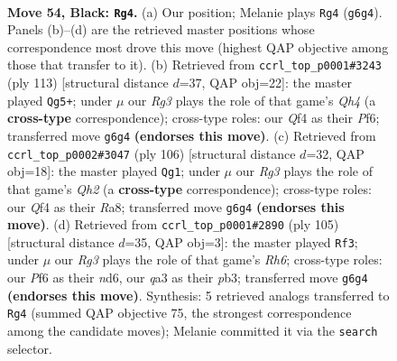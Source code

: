 \documentclass[11pt]{article}
\begin{document}
\clearpage

\begin{figure}[p]\centering
\begin{subfigure}{0.46\textwidth}\centering
\resizebox{\linewidth}{!}{%
\newchessgame
\chessboard[
  setfen={8/8/5pr1/3p1k2/5q2/Q5P1/P6P/6K1 b - - 3 54},
  showmover=false,
  pgfstyle=straightmove, color=movearrow, markmove={g6-g4}
]}
\caption{}
\end{subfigure}\hfill
\begin{subfigure}{0.46\textwidth}\centering
\resizebox{\linewidth}{!}{%
\newchessgame
\chessboard[
  setfen={8/7p/5p1k/p1Q2P1q/P7/6K1/5P2/8 b - - 4 57},
  showmover=false,
  pgfstyle=straightmove, color=movearrow, markmove={h5-g5}
]}
\caption{}
\end{subfigure}
\\[4pt]
\begin{subfigure}{0.46\textwidth}\centering
\resizebox{\linewidth}{!}{%
\newchessgame
\chessboard[
  setfen={R7/6pk/7p/8/1p6/8/1P4PQ/4q2K w - - 7 54},
  showmover=false,
  pgfstyle=straightmove, color=movearrow, markmove={h2-g1}
]}
\caption{}
\end{subfigure}\hfill
\begin{subfigure}{0.46\textwidth}\centering
\resizebox{\linewidth}{!}{%
\newchessgame
\chessboard[
  setfen={8/8/3N4/p7/5qk1/1P5r/2P1Q3/1K6 b - - 2 53},
  showmover=false,
  pgfstyle=straightmove, color=movearrow, markmove={h3-f3}
]}
\caption{}
\end{subfigure}
\caption{\textbf{Move 54, Black: \texttt{Rg4}.} (a) Our position; Melanie plays \texttt{Rg4} (\texttt{g6g4}). Panels (b)--(d) are the retrieved master positions whose correspondence most drove this move (highest QAP objective among those that transfer to it). (b) Retrieved from \texttt{ccrl\_top\_p0001\#3243} (ply 113) [structural distance $d$=37, QAP obj=22]: the master played \texttt{Qg5+}; under $\mu$ our \emph{Rg3} plays the role of that game's \emph{Qh4} (a \textbf{cross-type} correspondence); cross-type roles: our \emph{Q}f4 as their \emph{P}f6; transferred move \texttt{g6g4} \textbf{(endorses this move)}. (c) Retrieved from \texttt{ccrl\_top\_p0002\#3047} (ply 106) [structural distance $d$=32, QAP obj=18]: the master played \texttt{Qg1}; under $\mu$ our \emph{Rg3} plays the role of that game's \emph{Qh2} (a \textbf{cross-type} correspondence); cross-type roles: our \emph{Q}f4 as their \emph{R}a8; transferred move \texttt{g6g4} \textbf{(endorses this move)}. (d) Retrieved from \texttt{ccrl\_top\_p0001\#2890} (ply 105) [structural distance $d$=35, QAP obj=3]: the master played \texttt{Rf3}; under $\mu$ our \emph{Rg3} plays the role of that game's \emph{Rh6}; cross-type roles: our \emph{P}f6 as their \emph{n}d6, our \emph{q}a3 as their \emph{p}b3; transferred move \texttt{g6g4} \textbf{(endorses this move)}. Synthesis: 5 retrieved analogs transferred to \texttt{Rg4} (summed QAP objective 75, the strongest correspondence among the candidate moves); Melanie committed it via the \texttt{search} selector.}
\label{fig:thought-m107}
\end{figure}
\end{document}
